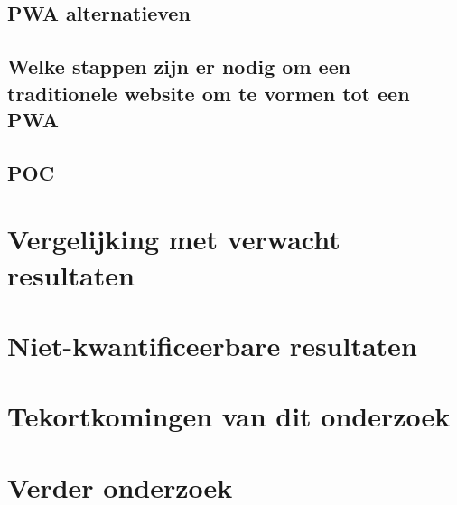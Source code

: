 \subsection{PWA alternatieven}
\subsection{Welke stappen zijn er nodig om een traditionele website om te vormen tot een PWA}
\subsection{POC}

\section{Vergelijking met verwacht resultaten}

\section{Niet-kwantificeerbare resultaten}

\section{Tekortkomingen van dit onderzoek}

\section{Verder onderzoek}
